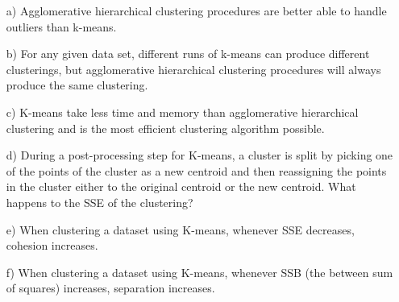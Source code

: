 \documentclass[11pt]{article}
\begin{document}
\begin{itemize}
  \item[a)]	Agglomerative hierarchical clustering procedures are better able to handle outliers than k-means.

  \item[b)]	For any given data set, different runs of k-means can produce different clusterings, but agglomerative hierarchical clustering procedures will always produce the same clustering.

  \item[c)]	K-means take less time and memory than agglomerative hierarchical clustering and is the most efficient clustering algorithm possible.

  \item[d)]	During a post-processing step for K-means, a cluster is split by picking one of the points of the cluster as a new centroid and then reassigning the points in the cluster either to the original centroid or the new centroid. What happens to the SSE of the clustering?

  \item[e)]	When clustering a dataset using K-means, whenever SSE decreases, cohesion increases.

  \item[f)]	When clustering a dataset using K-means, whenever SSB (the between sum of squares) increases, separation increases.


\end{itemize}
\end{document}
